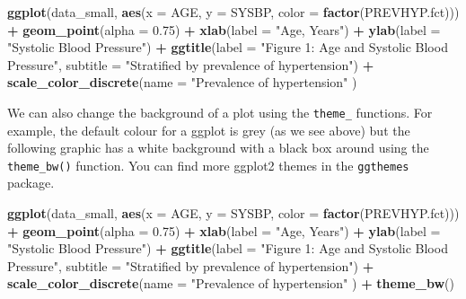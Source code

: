 \documentclass[
]{article}
\newenvironment{Shaded}{\begin{snugshade}}{\end{snugshade}}
\newcommand{\DataTypeTok}[1]{\textcolor[rgb]{0.13,0.29,0.53}{#1}}
\newcommand{\FloatTok}[1]{\textcolor[rgb]{0.00,0.00,0.81}{#1}}
\newcommand{\KeywordTok}[1]{\textcolor[rgb]{0.13,0.29,0.53}{\textbf{#1}}}
\newcommand{\NormalTok}[1]{#1}
\newcommand{\OperatorTok}[1]{\textcolor[rgb]{0.81,0.36,0.00}{\textbf{#1}}}
\newcommand{\StringTok}[1]{\textcolor[rgb]{0.31,0.60,0.02}{#1}}
\begin{document}
\begin{Shaded}
\begin{Highlighting}[]
\KeywordTok{ggplot}\NormalTok{(data_small, }
      \KeywordTok{aes}\NormalTok{(}\DataTypeTok{x =}\NormalTok{ AGE, }\DataTypeTok{y =}\NormalTok{ SYSBP, }\DataTypeTok{color =} \KeywordTok{factor}\NormalTok{(PREVHYP.fct))) }\OperatorTok{+}
\StringTok{  }\KeywordTok{geom_point}\NormalTok{(}\DataTypeTok{alpha =} \FloatTok{0.75}\NormalTok{) }\OperatorTok{+}
\StringTok{  }\KeywordTok{xlab}\NormalTok{(}\DataTypeTok{label =} \StringTok{"Age, Years"}\NormalTok{) }\OperatorTok{+}\StringTok{ }
\StringTok{  }\KeywordTok{ylab}\NormalTok{(}\DataTypeTok{label =} \StringTok{"Systolic Blood Pressure"}\NormalTok{) }\OperatorTok{+}
\StringTok{  }\KeywordTok{ggtitle}\NormalTok{(}\DataTypeTok{label =} \StringTok{"Figure 1: Age and Systolic Blood Pressure"}\NormalTok{, }
          \DataTypeTok{subtitle =} \StringTok{"Stratified by prevalence of hypertension"}\NormalTok{) }\OperatorTok{+}\StringTok{ }
\StringTok{  }\KeywordTok{scale_color_discrete}\NormalTok{(}\DataTypeTok{name =} \StringTok{"Prevalence of hypertension"}\NormalTok{ )}
\end{Highlighting}
\end{Shaded}

We can also change the background of a plot using the \texttt{theme\_}
functions. For example, the default colour for a ggplot is grey (as we
see above) but the following graphic has a white background with a black
box around using the \texttt{theme\_bw()} function. You can find more
ggplot2 themes in the \texttt{ggthemes} package.

\begin{Shaded}
\begin{Highlighting}[]
\KeywordTok{ggplot}\NormalTok{(data_small, }
      \KeywordTok{aes}\NormalTok{(}\DataTypeTok{x =}\NormalTok{ AGE, }\DataTypeTok{y =}\NormalTok{ SYSBP, }\DataTypeTok{color =} \KeywordTok{factor}\NormalTok{(PREVHYP.fct))) }\OperatorTok{+}
\StringTok{  }\KeywordTok{geom_point}\NormalTok{(}\DataTypeTok{alpha =} \FloatTok{0.75}\NormalTok{) }\OperatorTok{+}
\StringTok{  }\KeywordTok{xlab}\NormalTok{(}\DataTypeTok{label =} \StringTok{"Age, Years"}\NormalTok{) }\OperatorTok{+}\StringTok{ }
\StringTok{  }\KeywordTok{ylab}\NormalTok{(}\DataTypeTok{label =} \StringTok{"Systolic Blood Pressure"}\NormalTok{) }\OperatorTok{+}
\StringTok{  }\KeywordTok{ggtitle}\NormalTok{(}\DataTypeTok{label =} \StringTok{"Figure 1: Age and Systolic Blood Pressure"}\NormalTok{, }
          \DataTypeTok{subtitle =} \StringTok{"Stratified by prevalence of hypertension"}\NormalTok{) }\OperatorTok{+}\StringTok{ }
\StringTok{  }\KeywordTok{scale_color_discrete}\NormalTok{(}\DataTypeTok{name =} \StringTok{"Prevalence of hypertension"}\NormalTok{ ) }\OperatorTok{+}\StringTok{ }
\StringTok{  }\KeywordTok{theme_bw}\NormalTok{()}
\end{Highlighting}
\end{Shaded}
\end{document}
